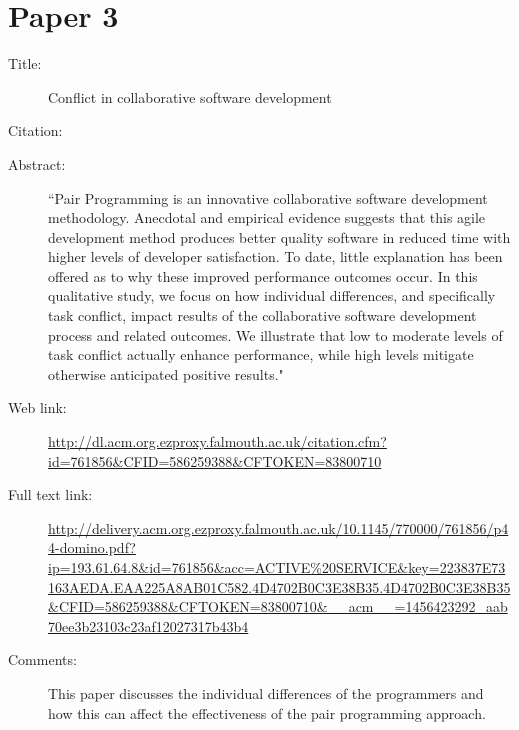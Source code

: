 \documentclass{scrartcl}
\begin{document}
\section*{Paper 3}
\begin{description}
\item[Title:] Conflict in collaborative software development
\item[Citation:] \cite{Domino:2003}
\item[Abstract:] ``Pair Programming is an innovative collaborative software development methodology. Anecdotal and empirical evidence suggests that this agile development method produces better quality software in reduced time with higher levels of developer satisfaction. To date, little explanation has been offered as to why these improved performance outcomes occur. In this qualitative study, we focus on how individual differences, and specifically task conflict, impact results of the collaborative software development process and related outcomes. We illustrate that low to moderate levels of task conflict actually enhance performance, while high levels mitigate otherwise anticipated positive results."
\item[Web link:]  \url{http://dl.acm.org.ezproxy.falmouth.ac.uk/citation.cfm?id=761856&CFID=586259388&CFTOKEN=83800710}
\item[Full text link:] \url{http://delivery.acm.org.ezproxy.falmouth.ac.uk/10.1145/770000/761856/p44-domino.pdf?ip=193.61.64.8&id=761856&acc=ACTIVE%20SERVICE&key=223837E73163AEDA.EAA225A8AB01C582.4D4702B0C3E38B35.4D4702B0C3E38B35&CFID=586259388&CFTOKEN=83800710&__acm__=1456423292_aab70ee3b23103c23af12027317b43b4}
\item[Comments:] This paper discusses the individual differences of the programmers and how this can affect the effectiveness of the pair programming approach.
\end{description}
\end{document}
